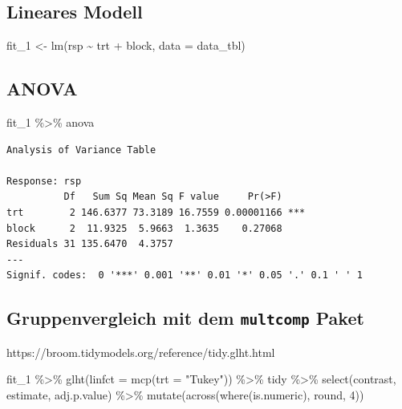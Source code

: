 \documentclass[
  letterpaper,
  DIV=11,
  oneside]{scrreport}
\newenvironment{Shaded}{\begin{snugshade}}{\end{snugshade}}
\newcommand{\AttributeTok}[1]{\textcolor[rgb]{0.40,0.45,0.13}{#1}}
\newcommand{\DecValTok}[1]{\textcolor[rgb]{0.68,0.00,0.00}{#1}}
\newcommand{\FunctionTok}[1]{\textcolor[rgb]{0.28,0.35,0.67}{#1}}
\newcommand{\NormalTok}[1]{\textcolor[rgb]{0.00,0.23,0.31}{#1}}
\newcommand{\OtherTok}[1]{\textcolor[rgb]{0.00,0.23,0.31}{#1}}
\newcommand{\SpecialCharTok}[1]{\textcolor[rgb]{0.37,0.37,0.37}{#1}}
\newcommand{\StringTok}[1]{\textcolor[rgb]{0.13,0.47,0.30}{#1}}
\begin{document}
\hypertarget{lineares-modell}{%
\subsection{Lineares Modell}\label{lineares-modell}}

\begin{Shaded}
\begin{Highlighting}[]
\NormalTok{fit\_1 }\OtherTok{\textless{}{-}} \FunctionTok{lm}\NormalTok{(rsp }\SpecialCharTok{\textasciitilde{}}\NormalTok{ trt }\SpecialCharTok{+}\NormalTok{ block, }\AttributeTok{data =}\NormalTok{ data\_tbl)}
\end{Highlighting}
\end{Shaded}

\hypertarget{anova}{%
\subsection{ANOVA}\label{anova}}

\begin{Shaded}
\begin{Highlighting}[]
\NormalTok{fit\_1 }\SpecialCharTok{\%\textgreater{}\%}\NormalTok{ anova}
\end{Highlighting}
\end{Shaded}

\begin{verbatim}
Analysis of Variance Table

Response: rsp
          Df   Sum Sq Mean Sq F value     Pr(>F)    
trt        2 146.6377 73.3189 16.7559 0.00001166 ***
block      2  11.9325  5.9663  1.3635    0.27068    
Residuals 31 135.6470  4.3757                       
---
Signif. codes:  0 '***' 0.001 '**' 0.01 '*' 0.05 '.' 0.1 ' ' 1
\end{verbatim}

\hypertarget{gruppenvergleich-mit-dem-multcomp-paket}{%
\subsection{\texorpdfstring{Gruppenvergleich mit dem \texttt{multcomp}
Paket}{Gruppenvergleich mit dem multcomp Paket}}\label{gruppenvergleich-mit-dem-multcomp-paket}}

https://broom.tidymodels.org/reference/tidy.glht.html

\begin{Shaded}
\begin{Highlighting}[]
\NormalTok{fit\_1 }\SpecialCharTok{\%\textgreater{}\%} 
  \FunctionTok{glht}\NormalTok{(}\AttributeTok{linfct =} \FunctionTok{mcp}\NormalTok{(}\AttributeTok{trt =} \StringTok{"Tukey"}\NormalTok{)) }\SpecialCharTok{\%\textgreater{}\%} 
\NormalTok{  tidy }\SpecialCharTok{\%\textgreater{}\%} 
  \FunctionTok{select}\NormalTok{(contrast, estimate, adj.p.value) }\SpecialCharTok{\%\textgreater{}\%} 
  \FunctionTok{mutate}\NormalTok{(}\FunctionTok{across}\NormalTok{(}\FunctionTok{where}\NormalTok{(is.numeric), round, }\DecValTok{4}\NormalTok{))}
\end{Highlighting}
\end{Shaded}
\end{document}
